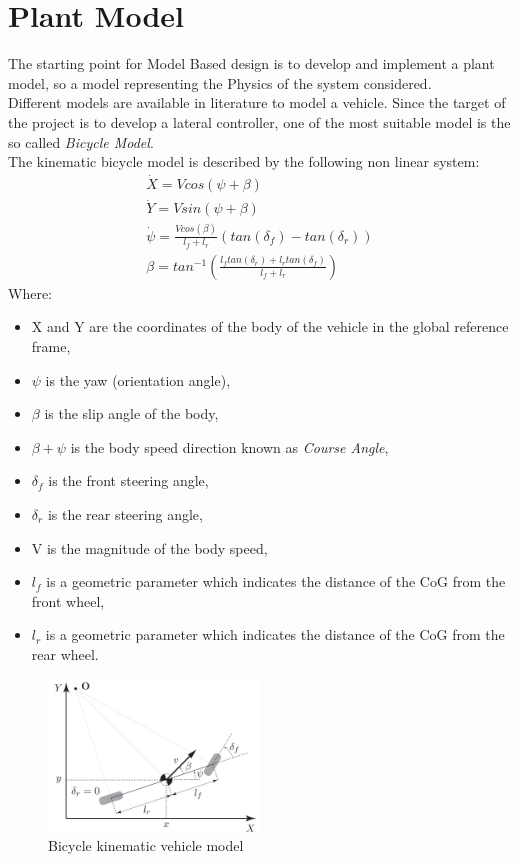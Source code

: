 \section{Plant Model}
\label{chap:Vehicle_model}
The starting point for Model Based design is to develop and implement a plant model, so a model representing the Physics of the system considered.\\
Different models are available in literature to model a vehicle. Since the target of the project is to develop a lateral controller, one of the most suitable model is the so called \textit{Bicycle Model}.\\
The kinematic bicycle model is described by the following non linear system:
\begin{align}
    \dot{X} = Vcos(\psi + \beta)\\
    \dot{Y} = Vsin(\psi + \beta)\\
    \dot{\psi} = \frac{Vcos(\beta)}{l_f + l_r}\left(tan(\delta_f) - tan(\delta_r)\right)\\
    \beta = tan^{-1}\left(\frac{l_ftan(\delta_r) + l_rtan(\delta_f)}{l_f + l_r}\right)
\end{align}
Where:
\begin{itemize}
    \item X and Y are the coordinates of the body of the vehicle in the global reference frame,
    \item $\psi$ is the yaw (orientation angle),
    \item $\beta$ is the slip angle of the body,
    \item $\beta + \psi$ is the body speed direction known as \textit{Course Angle},
    \item $\delta_f$ is the front steering angle,
    \item $\delta_r$ is the rear steering angle,
    \item V is the magnitude of the body speed,
    \item $l_f$ is a geometric parameter which indicates the distance of the CoG from the front wheel,
    \item $l_r$ is a geometric parameter which indicates the distance of the CoG from the rear wheel.
\end{itemize}
\begin{figure}[H]
    \centering
    \includegraphics[width=0.5\textwidth]{Figures/Bicycle_model.jpg}
    \caption{Bicycle kinematic vehicle model}
    \label{fig:Bicycle_kin}
\end{figure}
